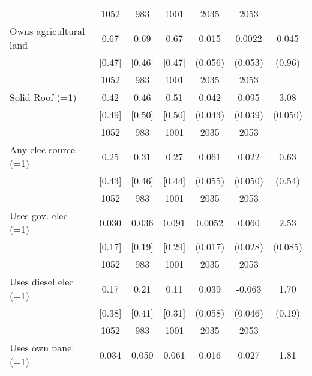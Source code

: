 \begin{table}[htbp]
\begin{tabular*}{1\hsize}{@{\hskip\tabcolsep\extracolsep\fill}l*{1}{cccccc}}
                                &     1052&      983&     1001&     2035         &     2053         &                  \\
Owns agricultural land          &     0.67&     0.69&     0.67&    0.015         &   0.0022         &    0.045         \\
                                &   [0.47]&   [0.46]&   [0.47]&  (0.056)         &  (0.053)         &   (0.96)         \\
                                &     1052&      983&     1001&     2035         &     2053         &                  \\
Solid Roof (=1)                 &     0.42&     0.46&     0.51&    0.042         &    0.095\sym{**} &     3.08\sym{*}  \\
                                &   [0.49]&   [0.50]&   [0.50]&  (0.043)         &  (0.039)         &  (0.050)         \\
                                &     1052&      983&     1001&     2035         &     2053         &                  \\
Any elec source (=1)            &     0.25&     0.31&     0.27&    0.061         &    0.022         &     0.63         \\
                                &   [0.43]&   [0.46]&   [0.44]&  (0.055)         &  (0.050)         &   (0.54)         \\
                                &     1052&      983&     1001&     2035         &     2053         &                  \\
Uses gov. elec (=1)             &    0.030&    0.036&    0.091&   0.0052         &    0.060\sym{**} &     2.53\sym{*}  \\
                                &   [0.17]&   [0.19]&   [0.29]&  (0.017)         &  (0.028)         &  (0.085)         \\
                                &     1052&      983&     1001&     2035         &     2053         &                  \\
Uses diesel elec (=1)           &     0.17&     0.21&     0.11&    0.039         &   -0.063         &     1.70         \\
                                &   [0.38]&   [0.41]&   [0.31]&  (0.058)         &  (0.046)         &   (0.19)         \\
                                &     1052&      983&     1001&     2035         &     2053         &                  \\
Uses own panel (=1)             &    0.034&    0.050&    0.061&    0.016         &    0.027\sym{*}  &     1.81         \\

\end{tabular*}
\end{table}
